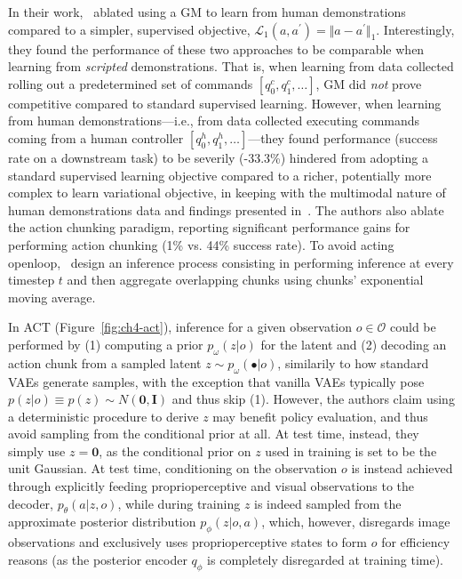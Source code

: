 In their work,~\citet{zhaoLearningFineGrainedBimanual2023} ablated using a GM to learn from human demonstrations compared to a simpler, supervised objective, \( \mathcal L_1(a,a^\prime) = \Vert a - a^\prime \Vert_1 \).
Interestingly, they found the performance of these two approaches to be comparable when learning from \emph{scripted} demonstrations.
That is, when learning from data collected rolling out a predetermined set of commands \( [q^c_0, q^c_1, \dots] \), GM did \emph{not} prove competitive compared to standard supervised learning.
However, when learning from human demonstrations---i.e., from data collected executing commands coming from a human controller \( [q^h_0, q^h_1, \dots] \)---they found performance (success rate on a downstream task) to be severily (-33.3\%) hindered from adopting a standard supervised learning objective compared to a richer, potentially more complex to learn variational objective, in keeping with the multimodal nature of human demonstrations data and findings presented in~\citet{florenceImplicitBehavioralCloning2022}.
The authors also ablate the action chunking paradigm, reporting significant performance gains for performing action chunking (1\% vs. 44\% success rate).
To avoid acting openloop,~\citet{zhaoLearningFineGrainedBimanual2023} design an inference process consisting in performing inference at every timestep \( t \) and then aggregate overlapping chunks using chunks' exponential moving average.  

In ACT (Figure~\ref{fig:ch4-act}), inference for a given observation \( o \in \mathcal O \) could be performed by (1) computing a prior \( p_\omega(z \vert o) \) for the latent and (2) decoding an action chunk from a sampled latent \( z \sim p_\omega(\bullet \vert o) \), similarily to how standard VAEs generate samples, with the exception that vanilla VAEs typically pose \( p(z\vert o) \equiv p(z) \sim N(\mathbf{0}, \mathbf{I}) \) and thus skip (1).
However, the authors claim using a deterministic procedure to derive \( z \) may benefit policy evaluation, and thus avoid sampling from the conditional prior at all.
At test time, instead, they simply use \( z = \mathbf{0} \), as the conditional prior on \( z \) used in training is set to be the unit Gaussian.
At test time, conditioning on the observation \( o \) is instead achieved through explicitly feeding proprioperceptive and visual observations to the decoder, \( p_\theta(a \vert z, o) \), while during training \( z \) is indeed sampled from the approximate posterior distribution \(p_\phi(z \vert o, a)\), which, however, disregards image observations and exclusively uses proprioperceptive states to form \( o \) for efficiency reasons (as the posterior encoder \(q_\phi \) is completely disregarded at training time).

